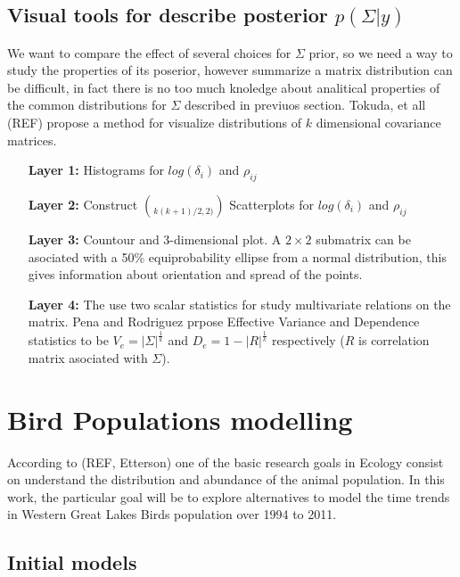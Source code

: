 \documentclass{article}
\begin{document}
\subsection{Visual tools for describe posterior $p(\Sigma\vert y)$}

We want to compare the effect of several choices for $\Sigma$ prior, so we need a way to study the properties of its poserior, however summarize a matrix distribution can be difficult, in fact there is no too much knoledge about analitical properties of the common distributions for $\Sigma$ described in previuos section. Tokuda, et all (REF) propose a method for visualize distributions of $k$ dimensional covariance matrices. 

\begin{itemize}
	\item[\textbf{Layer 1:}] Histograms for $log(\delta_i)$ and $\rho_{ij}$ 
	\item[\textbf{Layer 2:}] Construct $\choose{k(k+1)/2, 2)}$ Scatterplots for $log(\delta_i)$ and $\rho_{ij}$ 
	\item[\textbf{Layer 3:}] Countour and 3-dimensional plot. A $2\times2$ submatrix can be asociated with a 50\% equiprobability ellipse from a normal distribution, this gives information about orientation and spread of the points. 
	\item[\textbf{Layer 4:}] The use two scalar statistics for study multivariate relations on the matrix. Pena and Rodriguez prpose Effective Variance and Dependence statistics to be $V_e = |\Sigma|^{\frac{1}{k}}$ and $D_e=1-|R|^{\frac{1}{k}}$ respectively ($R$ is correlation matrix asociated with $\Sigma$). 
\end{itemize}


\section{ Bird Populations modelling} 
According to (REF, Etterson) one of the basic research goals in Ecology consist on understand the distribution and abundance of the animal population. In this work, the particular goal will be to explore alternatives to model the time trends in Western Great Lakes Birds population over 1994 to 2011. 

\subsection{Initial models} 
\end{document}
